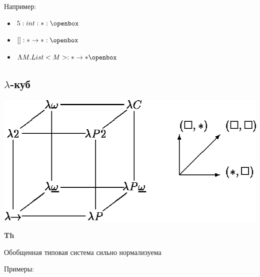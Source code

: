 \documentclass[12pt]{article}
\begin{document}
Например:
\begin{itemize}[leftmargin = 2cm]
    \item $5:int:*:\openbox$
    \item $[]:*\rightarrow*:\openbox$
    \item $\Lambda M.List<M>:*\rightarrow*\openbox$
\end{itemize}

\subsection{$\lambda$-куб}

\begin{center}
    {\includegraphics[scale=0.5]{pic.png}}
\end{center}

\textbf{Th}  

    Обобщенная типовая система сильно нормализуема

\vspace{5mm}   

Примеры:
\end{document}
